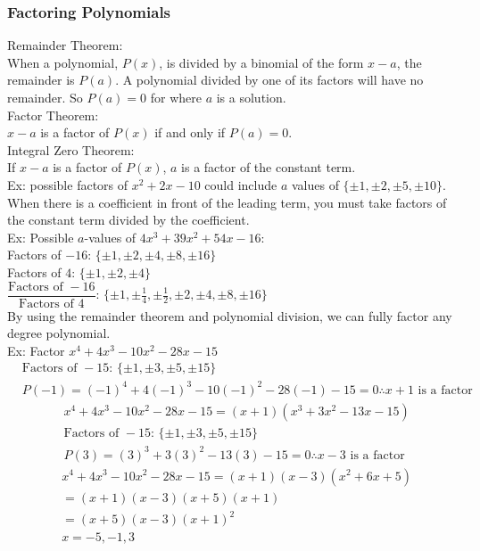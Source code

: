 \subsubsection{Factoring Polynomials}
Remainder Theorem:\\
When a polynomial, $P(x)$, is divided by a binomial of the form $x-a$, the remainder is $P(a)$. A polynomial divided by one of its factors will have no remainder. So $P(a)=0$ for where $a$ is a solution.\\
Factor Theorem:\\
$x-a$ is a factor of $P(x)$ if and only if $P(a)=0$.\\
Integral Zero Theorem:\\
If $x-a$ is a factor of $P(x)$, $a$ is a factor of the constant term.\\
Ex: possible factors of $x^2+2x-10$ could include $a$ values of $\{\pm1,\pm2,\pm5,\pm10\}$.\\
When there is a coefficient in front of the leading term, you must take factors of the constant term divided by the coefficient.\\
Ex: Possible $a$-values of $4x^3+39x^2+54x-16$:\\
Factors of $-16$: $\{\pm1,\pm2,\pm4,\pm8,\pm16\}$\\
Factors of $4$: $\{\pm1,\pm2,\pm4\}$\\
$\dfrac{\text{Factors of }-16}{\text{Factors of }4}:\,\{\pm1,\pm\frac{1}{4},\pm\frac{1}{2},\pm2,\pm4,\pm8,\pm16\}$\\
By using the remainder theorem and polynomial division, we can fully factor any degree polynomial.\\
Ex: Factor $x^4+4x^3-10x^2-28x-15$\\
\begin{align*}
    &\text{Factors of }-15:\,\{\pm1,\pm3,\pm5,\pm15\}\\
    &P(-1)=(-1)^4+4(-1)^3-10(-1)^2-28(-1)-15=0\therefore x+1\text{ is a factor}
\end{align*}
\begin{align*}
    &x^4+4x^3-10x^2-28x-15=(x+1)(x^3+3x^2-13x-15)\\
    &\text{Factors of }-15:\,\{\pm1,\pm3,\pm5,\pm15\}\\
    &P(3)=(3)^3+3(3)^2-13(3)-15=0\therefore x-3\text{ is a factor}
\end{align*}
\begin{align*}
    &x^4+4x^3-10x^2-28x-15=(x+1)(x-3)(x^2+6x+5)\\
    &=(x+1)(x-3)(x+5)(x+1)\\
    &=(x+5)(x-3)(x+1)^2\\
    &x=-5,-1,3
\end{align*}

